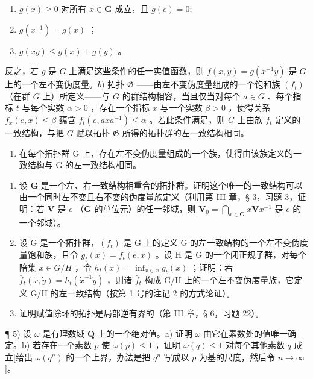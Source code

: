 \begin{enumerate}
\def\labelenumi{(\roman{enumi})}
\item
  \(g(x)\geqslant \mathrm{0}\) 对所有 \(x\in \mathbf{G}\) 成立，且 \(g(e) = \mathrm{0};\)
\item
  \(g(x^{-1}) = g(x)\) ；
\item
  \(g(xy) \leqslant g(x) + g(y)\) 。
\end{enumerate}

反之，若 \(g\) 是 \(G\) 上满足这些条件的任一实值函数，则 \(f(x, y) = g(x^{-1}y)\) 是 \(G\) 上的一个左不变伪度量。\(b)\) 拓扑 \(\mathfrak{G}\) ——由左不变伪度量组成的一个饱和族 \((f_t)\) （在群 \(G\) 上）所定义——与 \(G\) 的群结构相容，当且仅当对每个 \(a \in G\) 、每个指标 \(t\) 与每个实数 \(\alpha > 0\) ，存在一个指标 \(x\) 与一个实数 \(\beta > 0\) ，使得关系 \(f_x(e, x) \leqslant \beta\) 蕴含 \(f_t(e, axa^{-1}) \leqslant \alpha\) 。若此条件满足，则 \(G\) 上由族 \(f_t\) 定义的一致结构，与把 \(G\) 赋以拓扑 \(\mathfrak{G}\) 所得的拓扑群的左一致结构相同。

\begin{enumerate}
\def\labelenumi{\alph{enumi})}
\setcounter{enumi}{2}
\tightlist
\item
  在每个拓扑群 G 上，存在左不变伪度量组成的一个族，使得由该族定义的一致结构与 G 的左一致结构相同。
\end{enumerate}

\begin{enumerate}
\def\labelenumi{\arabic{enumi})}
\setcounter{enumi}{1}
\item
  设 \(\mathbf{G}\) 是一个左、右一致结构相重合的拓扑群。证明这个唯一的一致结构可以由一个同时左不变且右不变的伪度量族定义（利用第 III 章，§ 3，习题 3，证明：若 \(\mathbf{V}\) 是 \(e\) （\(\mathbf{G}\) 的单位元）的任一邻域，则 \(\mathbf{V}_0 = \bigcap_{x\in \mathbf{G}}x\mathbf{V}x^{-1}\) 是 \(e\) 的一个邻域）。
\item
  设 G 是一个拓扑群，\((f_{t})\) 是 G 上的定义 G 的左一致结构的一个左不变伪度量饱和族，且令 \(g_{t}(x)=f_{t}(e,x)\) 。设 H 是 G 的一个闭正规子群，对每个陪集 \(\dot{x}\in G/H\) ，令 \(h_{t}(\dot{x})=\inf_{x\in \dot{x}}g_{t}(x)\) ；证明：若 \(\bar{f}_{t}(\dot{x},\dot{y})=h_{t}(\dot{x}^{-1}\dot{y})\) ，则诸 \(\bar{f}_{t}\) 构成 G/H 上的一个左不变伪度量族，它定义 G/H 的左一致结构（按第 1 号的注记 2 的方式论证）。
\item
  证明赋值除环的拓扑是局部逆有界的（第 III 章，§ 6，习题 22）。
\end{enumerate}

¶ 5) 设 \(\omega\) 是有理数域 \(\mathbf{Q}\) 上的一个绝对值。a) 证明 \(\omega\) 由它在素数处的值唯一确定。b) 若存在一个素数 \(p\) 使 \(\omega(p) \leqslant 1\) ，证明 \(\omega(q) \leqslant 1\) 对每个其他素数 \(q\) 成立{[}给出 \(\omega(q^n)\) 的一个上界，办法是把 \(q^n\) 写成以 \(p\) 为基的尺度，然后令 \(n \to \infty\) {]}。

